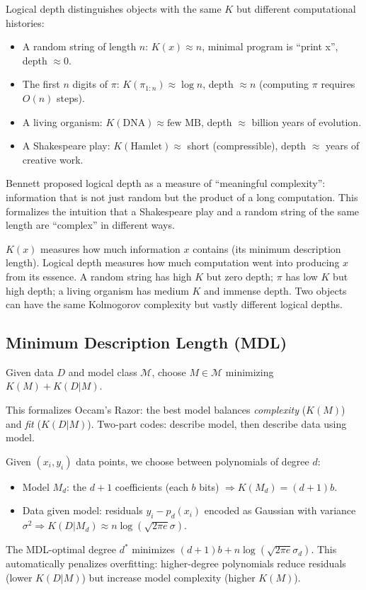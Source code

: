 Logical depth distinguishes objects with the same $K$ but different computational histories:
\begin{itemize}
\item A random string of length $n$: $K(x) \approx n$, minimal program is ``print x'', depth $\approx 0$.
\item The first $n$ digits of $\pi$: $K(\pi_{1:n}) \approx \log n$, depth $\approx n$ (computing $\pi$ requires $O(n)$ steps).
\item A living organism: $K(\text{DNA}) \approx \text{few MB}$, depth $\approx$ billion years of evolution.
\item A Shakespeare play: $K(\text{Hamlet}) \approx$ short (compressible), depth $\approx$ years of creative work.
\end{itemize}

Bennett proposed logical depth as a measure of ``meaningful complexity'': information that is not just random but the product of a long computation. This formalizes the intuition that a Shakespeare play and a random string of the same length are ``complex'' in different ways.

$K(x)$ measures how much information $x$ contains (its minimum description length). Logical depth measures how much computation went into producing $x$ from its essence. A random string has high $K$ but zero depth; $\pi$ has low $K$ but high depth; a living organism has medium $K$ and immense depth. Two objects can have the same Kolmogorov complexity but vastly different logical depths.

\subsection{Minimum Description Length (MDL)}
\label{sec:kolmogorov:mdl}

\begin{theorem}
Given data $D$ and model class $\mathcal{M}$, choose $M \in \mathcal{M}$ minimizing $K(M) + K(D|M)$.
\end{theorem}

This formalizes Occam's Razor: the best model balances \emph{complexity} ($K(M)$) and \emph{fit} ($K(D|M)$). Two-part codes: describe model, then describe data using model.

\begin{example}
Given $(x_i, y_i)$ data points, we choose between polynomials of degree $d$:
\begin{itemize}
\item Model $M_d$: the $d+1$ coefficients (each $b$ bits) $\Rightarrow K(M_d) = (d+1)b$.
\item Data given model: residuals $y_i - p_d(x_i)$ encoded as Gaussian with variance $\sigma^2 \Rightarrow K(D|M_d) \approx n \log(\sqrt{2\pi e}\sigma)$.
\end{itemize}
The MDL-optimal degree $d^*$ minimizes $(d+1)b + n\log(\sqrt{2\pi e}\sigma_d)$. This automatically penalizes overfitting: higher-degree polynomials reduce residuals (lower $K(D|M)$) but increase model complexity (higher $K(M)$).
\end{example}

